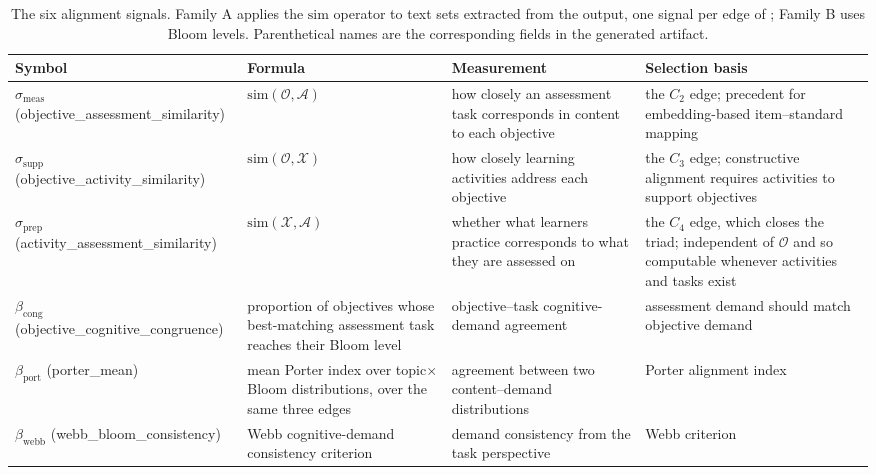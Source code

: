 \begin{table}[t]
  \caption{The six alignment signals. Family A applies the $\mathrm{sim}$ operator to
  text sets extracted from the output, one signal per edge of ;
  Family B uses Bloom levels. Parenthetical names are the corresponding fields in
  the generated artifact.}
  \label{tab:panel-signals}
  \small
  \begin{tabular}{@{}lp{}p{}p{}@{}}
    \toprule
    Symbol & Formula & Measurement & Selection basis \\
    \midrule
    $\sigma_{\mathrm{meas}}$ {\scriptsize(objective\_assessment\_similarity)} &
    $\mathrm{sim}(\mathcal{O},\mathcal{A})$ &
    how closely an assessment task corresponds in content to each objective &
    the $C_2$ edge; precedent for embedding-based item--standard
    mapping~\cite{xu2025itemalignment,clelandhuang2018traceability} \\
    $\sigma_{\mathrm{supp}}$ {\scriptsize(objective\_activity\_similarity)} &
    $\mathrm{sim}(\mathcal{O},\mathcal{X})$ &
    how closely learning activities address each objective &
    the $C_3$ edge; constructive alignment requires activities to support
    objectives~\cite{biggs1996enhancing} \\
    $\sigma_{\mathrm{prep}}$ {\scriptsize(activity\_assessment\_similarity)} &
    $\mathrm{sim}(\mathcal{X},\mathcal{A})$ &
    whether what learners practice corresponds to what they are assessed on &
    the $C_4$ edge, which closes the triad; independent of $\mathcal{O}$ and so
    computable whenever activities and tasks exist \\
    \midrule
    $\beta_{\mathrm{cong}}$ {\scriptsize(objective\_cognitive\_congruence)} &
    proportion of objectives whose best-matching assessment task reaches their
    Bloom level & objective--task cognitive-demand agreement &
    assessment demand should match objective
    demand~\cite{anderson2001taxonomy} \\
    $\beta_{\mathrm{port}}$ {\scriptsize(porter\_mean)} &
    mean Porter index over topic$\times$Bloom distributions, over the same three
    edges & agreement between two content--demand distributions &
    Porter alignment index~\cite{porter2002measuring,fulmer2011estimating} \\
    $\beta_{\mathrm{webb}}$ {\scriptsize(webb\_bloom\_consistency)} &
    Webb cognitive-demand consistency criterion &
    demand consistency from the task perspective &
    Webb criterion~\cite{webb1997criteria} \\
    \bottomrule
  \end{tabular}
\end{table}

